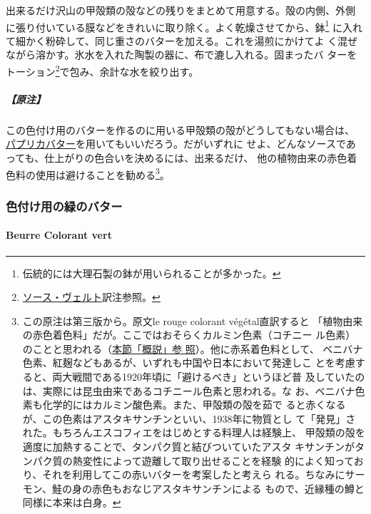 \begin{recette}
出来るだけ沢山の甲殻類の殻などの残りをまとめて用意する。殻の内側、外側
に張り付いている膜などをきれいに取り除く。よく乾燥させてから、鉢\footnote{伝統的には大理石製の鉢が用いられることが多かった。}
に入れて細かく粉砕して、同じ重さのバターを加える。これを湯煎にかけてよ
く混ぜながら溶かす。氷水を入れた陶製の器に、布で漉し入れる。固まったバ
ターをトーション\footnote{\protect\hyperlink{sauce-verte}{ソース・ヴェルト}訳注参照。}で包み、余計な水を絞り出す。

\hypertarget{ux539fux6ce8}{%
\subparagraph{【原注】}\label{ux539fux6ce8}}

この色付け用のバターを作るのに用いる甲殻類の殻がどうしてもない場合は、
\protect\hyperlink{beurre-de-paprika}{パプリカバター}を用いてもいいだろう。だがいずれに
せよ、どんなソースであっても、仕上がりの色合いを決めるには、出来るだけ、
他の植物由来の赤色着色料の使用は避けることを勧める\footnote{この原注は第三版から。原文le
  rouge colorant végétal直訳すると
  「植物由来の赤色着色料」だが。ここではおそらくカルミン色素（コチニー
  ル色素）のことと思われる（\protect\hyperlink{observation-sur-les-beurres-composes}{本節「概説」参
  照}）。他に赤系着色料として、
  ベニバナ色素、紅麹などもあるが、いずれも中国や日本において発達しこ
  とを考慮すると、両大戦間である1920年頃に「避けるべき」というほど普
  及していたのは、実際には昆虫由来であるコチニール色素と思われる。な
  お、ベニバナ色素も化学的にはカルミン酸色素。また、甲殻類の殻を茹で
  ると赤くなるが、この色素はアスタキサンチンといい、1938年に物質とし
  て「発見」された。もちろんエスコフィエをはじめとする料理人は経験上、
  甲殻類の殻を適度に加熱することで、タンパク質と結びついていたアスタ
  キサンチンがタンパク質の熱変性によって遊離して取り出せることを経験
  的によく知っており、それを利用してこの赤いバターを考案したと考えら
  れる。ちなみにサーモン、鮭の身の赤色もおなじアスタキサンチンによる
  もので、近縁種の鱒と同様に本来は白身。}。

\maeaki

\hypertarget{ux8272ux4ed8ux3051ux7528ux306eux7dd1ux306eux30d0ux30bfux30fc}{%
\subsubsection{色付け用の緑のバター}\label{ux8272ux4ed8ux3051ux7528ux306eux7dd1ux306eux30d0ux30bfux30fc}}

\hypertarget{beurre-colorant-vert}{%
\paragraph{Beurre Colorant vert}\label{beurre-colorant-vert}}


\end{recette}

